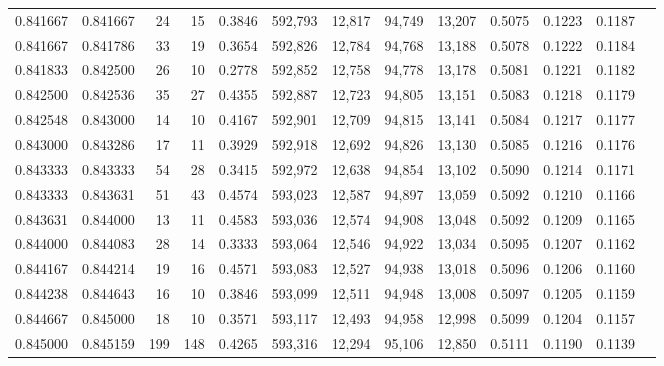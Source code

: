 \begin{tabular}{rrrrrrrrrrrrr}
0.841667 & 0.841667 &    24 &  15 &                                     0.3846 & 592,793 &  12,817 &  94,749 &  13,207 & 0.5075 & 0.1223 & 0.1187 \\
0.841667 & 0.841786 &    33 &  19 &                                     0.3654 & 592,826 &  12,784 &  94,768 &  13,188 & 0.5078 & 0.1222 & 0.1184 \\
0.841833 & 0.842500 &    26 &  10 &                                     0.2778 & 592,852 &  12,758 &  94,778 &  13,178 & 0.5081 & 0.1221 & 0.1182 \\
0.842500 & 0.842536 &    35 &  27 &                                     0.4355 & 592,887 &  12,723 &  94,805 &  13,151 & 0.5083 & 0.1218 & 0.1179 \\
0.842548 & 0.843000 &    14 &  10 &                                     0.4167 & 592,901 &  12,709 &  94,815 &  13,141 & 0.5084 & 0.1217 & 0.1177 \\
0.843000 & 0.843286 &    17 &  11 &                                     0.3929 & 592,918 &  12,692 &  94,826 &  13,130 & 0.5085 & 0.1216 & 0.1176 \\
0.843333 & 0.843333 &    54 &  28 &                                     0.3415 & 592,972 &  12,638 &  94,854 &  13,102 & 0.5090 & 0.1214 & 0.1171 \\
0.843333 & 0.843631 &    51 &  43 &                                     0.4574 & 593,023 &  12,587 &  94,897 &  13,059 & 0.5092 & 0.1210 & 0.1166 \\
0.843631 & 0.844000 &    13 &  11 &                                     0.4583 & 593,036 &  12,574 &  94,908 &  13,048 & 0.5092 & 0.1209 & 0.1165 \\
0.844000 & 0.844083 &    28 &  14 &                                     0.3333 & 593,064 &  12,546 &  94,922 &  13,034 & 0.5095 & 0.1207 & 0.1162 \\
0.844167 & 0.844214 &    19 &  16 &                                     0.4571 & 593,083 &  12,527 &  94,938 &  13,018 & 0.5096 & 0.1206 & 0.1160 \\
0.844238 & 0.844643 &    16 &  10 &                                     0.3846 & 593,099 &  12,511 &  94,948 &  13,008 & 0.5097 & 0.1205 & 0.1159 \\
0.844667 & 0.845000 &    18 &  10 &                                     0.3571 & 593,117 &  12,493 &  94,958 &  12,998 & 0.5099 & 0.1204 & 0.1157 \\
0.845000 & 0.845159 &   199 & 148 &                                     0.4265 & 593,316 &  12,294 &  95,106 &  12,850 & 0.5111 & 0.1190 & 0.1139 \\

\end{tabular}
